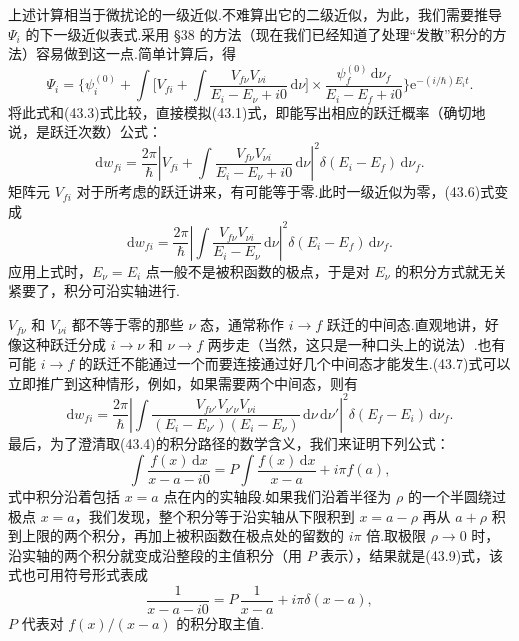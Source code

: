 上述计算相当于微扰论的一级近似.不难算出它的二级近似，为此，我们需要推导 $\varPsi_i$ 的下一级近似表式.采用 §38 的方法（现在我们已经知道了处理“发散”积分的方法）容易做到这一点.简单计算后，得
\begin{equation*}
  \varPsi_i=\biggl\{\psi_i^{(0)}+\int\biggl[V_{fi}
  +\int\frac{V_{f\nu}V_{\nu i}}{E_i-E_\nu+i0}\,\mathrm{d}\nu\biggr]\times
  \frac{\psi_f^{(0)}\,\mathrm{d}\nu_f}{E_i-E_f+i0}\biggr\}
  \mathrm{e}^{-(i/\hbar)E_it}.
\end{equation*}
将此式和(43.3)式比较，直接模拟(43.1)式，即能写出相应的跃迁概率（确切地说，是跃迁次数）公式：
\begin{equation}
  \mathrm{d}w_{fi}=\frac{2\pi}{\hbar}
  \left|V_{fi}+\int\frac{V_{f\nu}V_{\nu i}}{E_i-E_\nu+i0}\,\mathrm{d}\nu\right|^2
  \delta(E_i-E_f)\,\mathrm{d}\nu_f.
\end{equation}
矩阵元 $V_{fi}$ 对于所考虑的跃迁讲来，有可能等于零.此时一级近似为零，(43.6)式变成
\begin{equation}
  \mathrm{d}w_{fi}=\frac{2\pi}{\hbar}
  \left|\int\frac{V_{f\nu}V_{\nu i}}{E_i-E_\nu}\,\mathrm{d}\nu\right|^2
  \delta(E_i-E_f)\,\mathrm{d}\nu_f.
\end{equation}
应用上式时，$E_\nu=E_i$ 点一般不是被积函数的极点，于是对 $E_\nu$ 的积分方式就无关紧要了，积分可沿实轴进行.

$V_{f\nu}$ 和 $V_{\nu i}$ 都不等于零的那些 $\nu$ 态，通常称作 $i\to f$ 跃迁的中间态.直观地讲，好像这种跃迁分成 $i\to\nu$ 和 $\nu\to f$ 两步走（当然，这只是一种口头上的说法）.也有可能 $i\to f$ 的跃迁不能通过一个而要连接通过好几个中间态才能发生.(43.7)式可以立即推广到这种情形，例如，如果需要两个中间态，则有
\begin{equation}
  \mathrm{d}w_{fi}=\frac{2\pi}{\hbar}
  \left|\int\frac{V_{f\nu'}V_{\nu'\nu}V_{\nu i}}
  {\left(E_i-E_{\nu'}\right)\left(E_i-E_\nu\right)}
  \,\mathrm{d}\nu\,\mathrm{d}\nu'\right|^2
  \delta(E_f-E_i)\,\mathrm{d}\nu_f.
\end{equation}
最后，为了澄清取(43.4)的积分路径的数学含义，我们来证明下列公式：
\begin{equation}
  \int\frac{f(x)\,\mathrm{d}x}{x-a-i0}
  =P\int\frac{f(x)\,\mathrm{d}x}{x-a}+i\pi f(a),
\end{equation}
式中积分沿着包括 $x=a$ 点在内的实轴段.如果我们沿着半径为 $\rho$ 的一个半圆绕过极点 $x=a$，我们发现，整个积分等于沿实轴从下限积到 $x=a-\rho$ 再从 $a+\rho$ 积到上限的两个积分，再加上被积函数在极点处的留数的 $i\pi$ 倍.取极限 $\rho\to0$ 时，沿实轴的两个积分就变成沿整段的主值积分（用 $P$ 表示），结果就是(43.9)式，该式也可用符号形式表成
\begin{equation}
  \frac{1}{x-a-i0}=P\,\frac{1}{x-a}+i\pi\delta(x-a),
\end{equation}
$P$ 代表对 $f(x)/(x-a)$ 的积分取主值.

